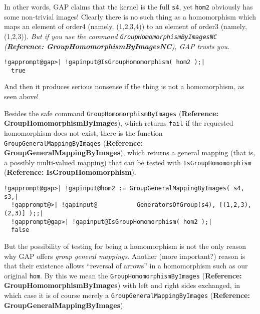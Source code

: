 \documentclass[a4paper,11pt]{report}
\begin{document}
{{ In other words, \textsf{GAP} claims that the kernel is the full \texttt{s4}, yet \texttt{hom2} obviously has some non-trivial images! Clearly there is no such thing as a
homomorphism which maps an element of order{\nobreakspace}4 (namely,
(1,2,3,4)) to an element of order{\nobreakspace}3 (namely, (1,2,3)). \emph{But if you use the command \texttt{GroupHomomorphismByImagesNC} (\textbf{Reference: GroupHomomorphismByImagesNC}), \textsf{GAP} trusts you.} 

 
\begin{Verbatim}[commandchars=!@|,fontsize=\small,frame=single,label=Example]
  !gapprompt@gap>| !gapinput@IsGroupHomomorphism( hom2 );|
  true
\end{Verbatim}
 

 And then it produces serious nonsense if the thing is not a homomorphism, as
seen above! 

 Besides the safe command \texttt{GroupHomomorphismByImages} (\textbf{Reference: GroupHomomorphismByImages}), which returns \texttt{fail} if the requested homomorphism does not exist, there is the function \texttt{GroupGeneralMappingByImages} (\textbf{Reference: GroupGeneralMappingByImages}), which returns a general mapping (that is, a possibly multi-valued mapping)
that can be tested with \texttt{IsGroupHomomorphism} (\textbf{Reference: IsGroupHomomorphism}). 

 
\begin{Verbatim}[commandchars=!@|,fontsize=\small,frame=single,label=Example]
  !gapprompt@gap>| !gapinput@hom2 := GroupGeneralMappingByImages( s4, s3,|
  !gapprompt@>| !gapinput@           GeneratorsOfGroup(s4), [(1,2,3),(2,3)] );;|
  !gapprompt@gap>| !gapinput@IsGroupHomomorphism( hom2 );|
  false
\end{Verbatim}
 

   But the possibility of testing for being a homomorphism is not the only reason
why \textsf{GAP} offers \emph{group general mappings}. Another (more important?) reason is that their existence allows ``reversal of arrows'' in a homomorphism such as our original \texttt{hom}. By this we mean the \texttt{GroupHomomorphismByImages} (\textbf{Reference: GroupHomomorphismByImages}) with left and right sides exchanged, in which case it is of course merely a \texttt{GroupGeneralMappingByImages} (\textbf{Reference: GroupGeneralMappingByImages}). 

}}
\end{document}
